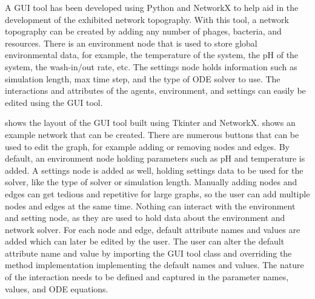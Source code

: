 A GUI tool has been developed using Python and NetworkX to help aid in the development of the exhibited network topography.
With this tool, a network topography can be created by adding any number of phages, bacteria, and resources. 
There is an environment node that is used to store global environmental data, for example, the temperature of the system, the pH of the system, the wash-in/out rate, etc.
The settings node holds information such as simulation length, max time step, and the type of ODE solver to use.
The interactions and attributes of the agents, environment, and settings can easily be edited using the GUI tool. 

 shows the layout of the GUI tool built using Tkinter and NetworkX.  shows an example network that can be created. %
There are numerous buttons that can be used to edit the graph, for example adding or removing nodes and edges. 
By default, an environment node holding parameters such as pH and temperature is added.
A settings node is added as well, holding settings data to be used for the solver, like the type of solver or simulation length.
Manually adding nodes and edges can get tedious and repetitive for large graphs, so the user can add multiple nodes and edges at the same time.
Nothing can interact with the environment and setting node, as they are used to hold data about the environment and network solver.
For each node and edge, default attribute names and values are added which can later be edited by the user. 
The user can alter the default attribute name and value by importing the GUI tool class and overriding the method implementation implementing the default names and values. 
The nature of the interaction needs to be defined and captured in the parameter names, values, and ODE equations.

